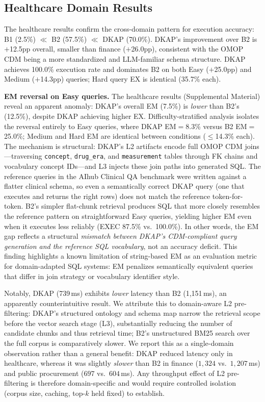 \documentclass[fleqn,10pt,lineno]{wlpeerj}
\begin{document}
\subsection{Healthcare Domain Results}

The healthcare results confirm the cross-domain pattern for execution accuracy: B1 (2.5\%) $\ll$ B2 (57.5\%) $\ll$ DKAP (70.0\%). DKAP's improvement over B2 is $+$12.5pp overall, smaller than finance ($+$26.0pp), consistent with the OMOP CDM being a more standardized and LLM-familiar schema structure. DKAP achieves 100.0\% execution rate and dominates B2 on both Easy ($+$25.0pp) and Medium ($+$14.3pp) queries; Hard query EX is identical (35.7\% each).

\textbf{EM reversal on Easy queries.} The healthcare results (Supplemental Material) reveal an apparent anomaly: DKAP's overall EM (7.5\%) is \textit{lower} than B2's (12.5\%), despite DKAP achieving higher EX. Difficulty-stratified analysis isolates the reversal entirely to Easy queries, where DKAP EM$=$8.3\% versus B2 EM$=$25.0\%; Medium and Hard EM are identical between conditions ($\leq$14.3\% each). The mechanism is structural: DKAP's L2 artifacts encode full OMOP CDM joins---traversing \texttt{concept}, \texttt{drug\_era}, and \texttt{measurement} tables through FK chains and vocabulary concept IDs---and L3 injects these join paths into generated SQL. The reference queries in the AIhub Clinical QA benchmark were written against a flatter clinical schema, so even a semantically correct DKAP query (one that executes and returns the right rows) does not match the reference token-for-token. B2's simpler flat-chunk retrieval produces SQL that more closely resembles the reference pattern on straightforward Easy queries, yielding higher EM even when it executes less reliably (EXEC 87.5\% vs.\ 100.0\%). In other words, the EM gap reflects a structural \textit{mismatch between DKAP's CDM-compliant query generation and the reference SQL vocabulary}, not an accuracy deficit. This finding highlights a known limitation of string-based EM as an evaluation metric for domain-adapted SQL systems: EM penalizes semantically equivalent queries that differ in join strategy or vocabulary identifier style.

Notably, DKAP (739\,ms) exhibits \textit{lower} latency than B2 (1{,}151\,ms), an apparently counterintuitive result. We attribute this to domain-aware L2 pre-filtering: DKAP's structured ontology and schema map narrow the retrieval scope before the vector search stage (L3), substantially reducing the number of candidate chunks and thus retrieval time; B2's unstructured BM25 search over the full corpus is comparatively slower. We report this as a single-domain observation rather than a general benefit: DKAP reduced latency only in healthcare, whereas it was slightly \textit{slower} than B2 in finance ($1{,}324$ vs.\ $1{,}207$\,ms) and public procurement ($697$ vs.\ $604$\,ms). Any throughput effect of L2 pre-filtering is therefore domain-specific and would require controlled isolation (corpus size, caching, top-$k$ held fixed) to establish.
\end{document}
